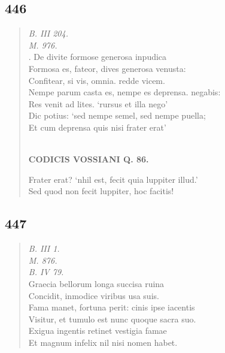 \documentclass[11pt, a4paper]{report}
\begin{document}
            \subsection*{446}
      \begin{verse}
      \textit{B. III 204.} \\ \textit{M. 976.} \\ . De divite formose generosa inpudica \\ Formosa es, fateor, dives generosa venusta: \\ Confitear, si vis, omnia. redde vicem. \\ Nempe parum casta es, nempe es deprensa. negabis: \\ Res venit ad lites. ‘rursus et illa nego’ \\ Dic potius: ‘sed nempe semel, sed nempe puella; \\ Et cum deprensa quis nisi frater erat’ \\ 
        ﻿\pagebreak 
    \begin{center} \textbf{CODICIS VOSSIANI Q. 86.} \end{center} \marginpar{[335]} Frater erat? ‘nhil est, fecit quia luppiter illud.’ \\ Sed quod non fecit luppiter, hoc facitis! \\ 
      \end{verse}
  
            \subsection*{447}
      \begin{verse}
      \textit{B. III 1.} \\ \textit{M. 876.} \\ \textit{B. IV 79.} \\ Graecia bellorum longa succisa ruina \\ Concidit, inmodice viribus usa suis. \\ Fama manet, fortuna perit: cinis ipse iacentis \\ Visitur, et tumulo est nunc quoque sacra suo. \\ Exigua ingentis retinet vestigia famae \\ Et magnum infelix nil nisi nomen habet. \\ 
      \end{verse}
  
\end{document}
